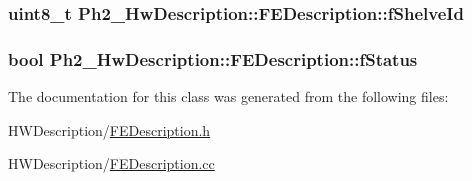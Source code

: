 \hypertarget{class_ph2___hw_description_1_1_f_e_description_a8a20ee1f2114b9a6da4483f5e0f8c625}{
\subsubsection[{f\-Shelve\-Id}]{\setlength{\rightskip}{0pt plus 5cm}uint8\-\_\-t Ph2\-\_\-\-Hw\-Description\-::\-F\-E\-Description\-::f\-Shelve\-Id}}\label{class_ph2___hw_description_1_1_f_e_description_a8a20ee1f2114b9a6da4483f5e0f8c625}
\hypertarget{class_ph2___hw_description_1_1_f_e_description_a646f651eb15f15a519006eca502e3418}{
\subsubsection[{f\-Status}]{\setlength{\rightskip}{0pt plus 5cm}bool Ph2\-\_\-\-Hw\-Description\-::\-F\-E\-Description\-::f\-Status}}\label{class_ph2___hw_description_1_1_f_e_description_a646f651eb15f15a519006eca502e3418}


The documentation for this class was generated from the following files\-:\begin{DoxyCompactItemize}
\item 
H\-W\-Description/\hyperlink{_f_e_description_8h}{F\-E\-Description.\-h}\item 
H\-W\-Description/\hyperlink{_f_e_description_8cc}{F\-E\-Description.\-cc}\end{DoxyCompactItemize}
